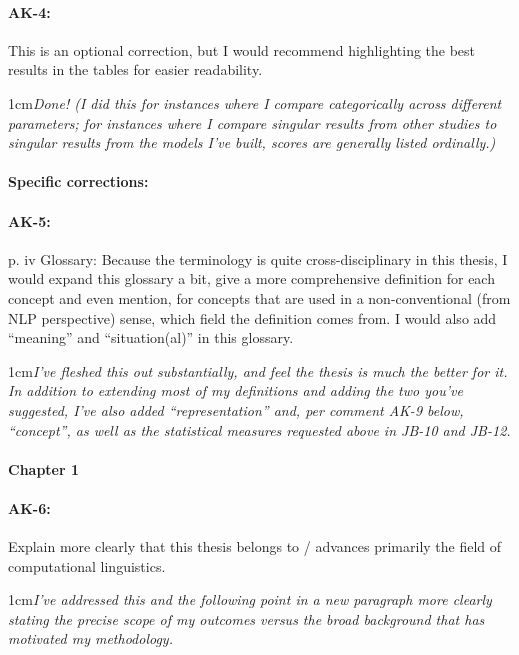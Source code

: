 \documentclass[11pt,a4paper]{article}
\newcommand{\res}[1]{\vspace{0.25cm} \begin{adjustwidth}{1cm}{}\emph{#1}\end{adjustwidth}}
\begin{document}
\paragraph{AK-4:} This is an optional correction, but I would recommend highlighting the best results in the tables for easier readability.

\res{Done!  (I did this for instances where I compare categorically across different parameters; for instances where I compare singular results from other studies to singular results from the models I've built, scores are generally listed ordinally.)}

\paragraph{Specific corrections:}

\paragraph{AK-5:} p. iv Glossary: Because the terminology is quite cross-disciplinary in this thesis, I would expand this glossary a bit, give a more comprehensive definition for each concept and even mention, for concepts that are used in a non-conventional (from NLP perspective) sense, which field the definition comes from. I would also add ``meaning'' and ``situation(al)'' in this glossary.

\res{I've fleshed this out substantially, and feel the thesis is much the better for it.  In addition to extending most of my definitions and adding the two you've suggested, I've also added ``representation'' and, per comment AK-9 below, ``concept'', as well as the statistical measures requested above in JB-10 and JB-12.}

\paragraph{Chapter 1}

\paragraph{AK-6:} Explain more clearly that this thesis belongs to / advances primarily the field of computational linguistics.

\res{I've addressed this and the following point in a new paragraph more clearly stating the precise scope of my outcomes versus the broad background that has motivated my methodology.}
\end{document}
